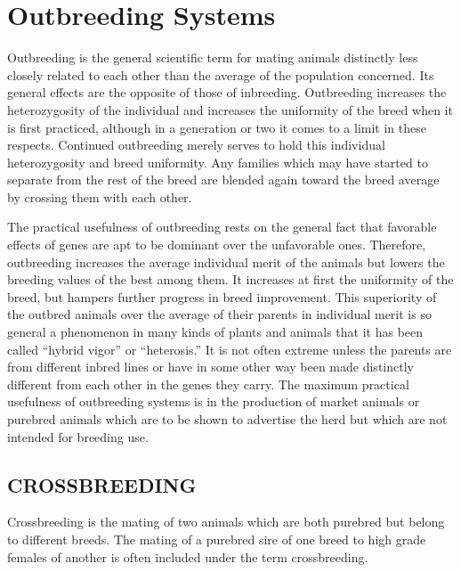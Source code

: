 \chapter{Outbreeding Systems}
\label{cha:Lush_Chapter_26}

Outbreeding is the general scientific term for mating animals distinctly
less closely related to each other than the average of the population
concerned. Its general effects are the opposite of those of inbreeding.
Outbreeding increases the heterozygosity of the individual and
increases the uniformity of the breed when it is first practiced, although
in a generation or two it comes to a limit in these respects. Continued
outbreeding merely serves to hold this individual heterozygosity and
breed uniformity. Any families which may have started to separate from
the rest of the breed are blended again toward the breed average by
crossing them with each other.

The practical usefulness of outbreeding rests on the general fact
that favorable effects of genes are apt to be dominant over the unfavorable
ones. Therefore, outbreeding increases the average individual
merit of the animals but lowers the breeding values of the best among
them. It increases at first the uniformity of the breed, but hampers further
progress in breed improvement. This superiority of the outbred
animals over the average of their parents in individual merit is so general
a phenomenon in many kinds of plants and animals that it has
been called ``hybrid vigor'' or ``heterosis.'' It is not often extreme unless
the parents are from different inbred lines or have in some other way
been made distinctly different from each other in the genes they carry.
The maximum practical usefulness of outbreeding systems is in the
production of market animals or purebred animals which are to be
shown to advertise the herd but which are not intended for breeding
use.

\section*{CROSSBREEDING}

Crossbreeding is the mating of two animals which are both purebred
but belong to different breeds. The mating of a purebred sire of
one breed to high grade females of another is often included under the
term crossbreeding.

